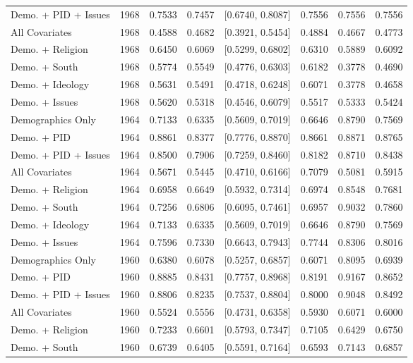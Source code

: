 \begin{longtable}{lrrrlrrr}
  Demo. + PID + Issues & 1968 & 0.7533 & 0.7457 & [0.6740, 0.8087] & 0.7556 & 0.7556 & 0.7556 \\ 
  All Covariates & 1968 & 0.4588 & 0.4682 & [0.3921, 0.5454] & 0.4884 & 0.4667 & 0.4773 \\ 
  Demo. + Religion & 1968 & 0.6450 & 0.6069 & [0.5299, 0.6802] & 0.6310 & 0.5889 & 0.6092 \\ 
  Demo. + South & 1968 & 0.5774 & 0.5549 & [0.4776, 0.6303] & 0.6182 & 0.3778 & 0.4690 \\ 
  Demo. + Ideology & 1968 & 0.5631 & 0.5491 & [0.4718, 0.6248] & 0.6071 & 0.3778 & 0.4658 \\ 
  Demo. + Issues & 1968 & 0.5620 & 0.5318 & [0.4546, 0.6079] & 0.5517 & 0.5333 & 0.5424 \\ 
  Demographics Only & 1964 & 0.7133 & 0.6335 & [0.5609, 0.7019] & 0.6646 & 0.8790 & 0.7569 \\ 
  Demo. + PID & 1964 & 0.8861 & 0.8377 & [0.7776, 0.8870] & 0.8661 & 0.8871 & 0.8765 \\ 
  Demo. + PID + Issues & 1964 & 0.8500 & 0.7906 & [0.7259, 0.8460] & 0.8182 & 0.8710 & 0.8438 \\ 
  All Covariates & 1964 & 0.5671 & 0.5445 & [0.4710, 0.6166] & 0.7079 & 0.5081 & 0.5915 \\ 
  Demo. + Religion & 1964 & 0.6958 & 0.6649 & [0.5932, 0.7314] & 0.6974 & 0.8548 & 0.7681 \\ 
  Demo. + South & 1964 & 0.7256 & 0.6806 & [0.6095, 0.7461] & 0.6957 & 0.9032 & 0.7860 \\ 
  Demo. + Ideology & 1964 & 0.7133 & 0.6335 & [0.5609, 0.7019] & 0.6646 & 0.8790 & 0.7569 \\ 
  Demo. + Issues & 1964 & 0.7596 & 0.7330 & [0.6643, 0.7943] & 0.7744 & 0.8306 & 0.8016 \\ 
  Demographics Only & 1960 & 0.6380 & 0.6078 & [0.5257, 0.6857] & 0.6071 & 0.8095 & 0.6939 \\ 
  Demo. + PID & 1960 & 0.8885 & 0.8431 & [0.7757, 0.8968] & 0.8191 & 0.9167 & 0.8652 \\ 
  Demo. + PID + Issues & 1960 & 0.8806 & 0.8235 & [0.7537, 0.8804] & 0.8000 & 0.9048 & 0.8492 \\ 
  All Covariates & 1960 & 0.5524 & 0.5556 & [0.4731, 0.6358] & 0.5930 & 0.6071 & 0.6000 \\ 
  Demo. + Religion & 1960 & 0.7233 & 0.6601 & [0.5793, 0.7347] & 0.7105 & 0.6429 & 0.6750 \\ 
  Demo. + South & 1960 & 0.6739 & 0.6405 & [0.5591, 0.7164] & 0.6593 & 0.7143 & 0.6857 \\ 

\end{longtable}
